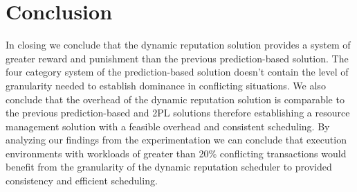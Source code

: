 \section{Conclusion}
\label{sec:conclusion}


In closing we conclude that the dynamic reputation solution provides a system of greater reward and punishment than the previous prediction-based solution. The four category system of the prediction-based solution doesn't contain the level of granularity needed to establish dominance in conflicting situations. We also conclude that the overhead of the dynamic reputation solution is comparable to the previous prediction-based and \ac{2PL} solutions therefore establishing a resource management solution with a feasible overhead and consistent scheduling. By analyzing our findings from the experimentation we can conclude that execution environments with workloads of greater than 20\% conflicting transactions would benefit from the granularity of the dynamic reputation scheduler to provided consistency and efficient scheduling.